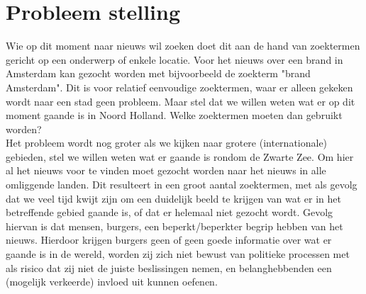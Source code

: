\documentclass[twoside,openright]{uva-bachelor-thesis}
\begin{document}
	\section{Probleem stelling}
		Wie op dit moment naar nieuws wil zoeken doet dit aan de hand van zoektermen gericht op een onderwerp of enkele locatie. Voor het nieuws over een brand in Amsterdam kan gezocht worden met bijvoorbeeld de zoekterm "brand Amsterdam". Dit is voor relatief eenvoudige zoektermen, waar er alleen gekeken wordt naar een stad geen probleem. Maar stel dat we willen weten wat er op dit moment gaande is in Noord Holland. Welke zoektermen moeten dan gebruikt worden? 
		\\[0.5cm]
		Het probleem wordt nog groter als we kijken naar grotere (internationale) gebieden, stel we willen weten wat er gaande is rondom de Zwarte Zee. Om hier al het nieuws voor te vinden moet gezocht worden naar het nieuws in alle omliggende landen. Dit resulteert in een groot aantal zoektermen, met als gevolg dat we veel tijd kwijt zijn om een duidelijk beeld te krijgen van wat er in het betreffende gebied gaande is, of dat er helemaal niet gezocht wordt. Gevolg hiervan is dat mensen, burgers, een beperkt/beperkter begrip hebben van het nieuws. Hierdoor krijgen burgers geen of geen goede informatie over wat er gaande is in de wereld, worden zij zich niet bewust van politieke processen met als risico dat zij niet de juiste beslissingen nemen, en belanghebbenden een (mogelijk verkeerde) invloed uit kunnen oefenen.
\end{document}
